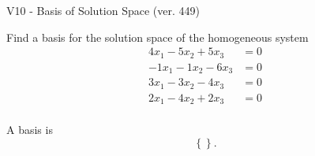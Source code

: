 \begin{exercise}
  \begin{exerciseTitle}V10 - Basis of Solution Space (ver. 449)\end{exerciseTitle}
  \begin{exerciseStatement}
    Find a basis for the solution space of the homogeneous system 
\begin{align*}
 4 x_ 1 -5 x_ 2 + 5 x_ 3 &= 0  \\ 
  -1 x_ 1 -1 x_ 2 -6 x_ 3 &= 0  \\ 
  3 x_ 1 -3 x_ 2 -4 x_ 3 &= 0  \\ 
  2 x_ 1 -4 x_ 2 + 2 x_ 3 &= 0  \\ 
 \end{align*}


 
  \end{exerciseStatement}

  \begin{exerciseAnswer}
   A basis is   
\[\left\{\right\}.\]

  


  \end{exerciseAnswer}
\end{exercise}